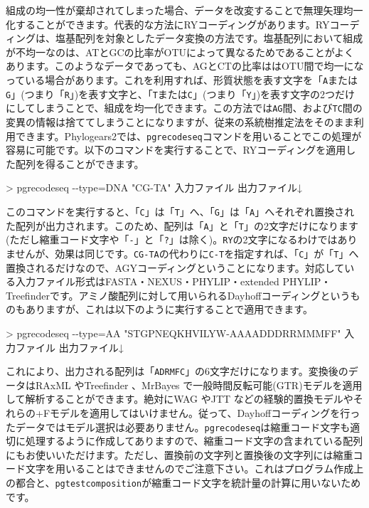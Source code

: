 \documentclass[titlepage,10pt,a4paper]{jsbook}
\newenvironment{cmd}{\begin{oframed}\raggedright\ttfamily\footnotesize\setlength{\baselineskip}{1.4em}}{\end{oframed}\vspace{-1em}}
\begin{document}
組成の均一性が棄却されてしまった場合、データを改変することで無理矢理均一化することができます。代表的な方法にRYコーディング\citep{Woese1991}があります。RYコーディングは、塩基配列を対象としたデータ変換の方法です。塩基配列において組成が不均一なのは、ATとGCの比率がOTUによって異なるためであることがよくあります。このようなデータであっても、AGとCTの比率ははOTU間で均一になっている場合があります。これを利用すれば、形質状態を表す文字を「\texttt{A}または\texttt{G}」(つまり「\texttt{R}」)を表す文字と、「\texttt{T}または\texttt{C}」(つまり「\texttt{Y}」)を表す文字の2つだけにしてしまうことで、組成を均一化できます。この方法では\texttt{AG}間、および\texttt{TC}間の変異の情報は捨ててしまうことになりますが、従来の系統樹推定法をそのまま利用できます。Phylogears2では、\texttt{pgrecodeseq}コマンドを用いることでこの処理が容易に可能です。以下のコマンドを実行することで、RYコーディングを適用した配列を得ることができます。
\begin{cmd}
{\textgreater} pgrecodeseq {-}{-}type=DNA "CG-TA" 入力ファイル 出力ファイル↓
\end{cmd}
このコマンドを実行すると、「\texttt{C}」は「\texttt{T}」へ、「\texttt{G}」は「\texttt{A}」へそれぞれ置換された配列が出力されます。このため、配列は「\texttt{A}」と「\texttt{T}」の2文字だけになります(ただし縮重コード文字や「\texttt{-}」と「\texttt{?}」は除く)。\texttt{RY}の2文字になるわけではありませんが、効果は同じです。\texttt{CG-TA}の代わりに\texttt{C-T}を指定すれば、「\texttt{C}」が「\texttt{T}」へ置換されるだけなので、AGYコーディングということになります。対応している入力ファイル形式はFASTA・NEXUS・PHYLIP・extended PHYLIP・Treefinderです。アミノ酸配列に対して用いられるDayhoffコーディング\citep{Hrdy2004}というものもありますが、これは以下のように実行することで適用できます。
\begin{cmd}
{\textgreater} pgrecodeseq {-}{-}type=AA "STGPNEQKHVILYW-AAAADDDRRMMMFF" 入力ファイル 出力ファイル↓
\end{cmd}
これにより、出力される配列は「\texttt{ADRMFC}」の6文字だけになります。変換後のデータはRAxML \citep{Stamatakis2006}やTreefinder \citep{Jobb2004}、MrBayes \citep{Ronquist2003}で一般時間反転可能(GTR)モデルを適用して解析することができます。絶対にWAG \citep{Whelan2001}やJTT \citep{Jones1992}などの経験的置換モデルやそれらの+Fモデルを適用してはいけません。従って、Dayhoffコーディングを行ったデータではモデル選択は必要ありません。\texttt{pgrecodeseq}は縮重コード文字も適切に処理するように作成してありますので、縮重コード文字の含まれている配列にもお使いいただけます。ただし、置換前の文字列と置換後の文字列には縮重コード文字を用いることはできませんのでご注意下さい。これはプログラム作成上の都合と、\texttt{pgtestcomposition}が縮重コード文字を統計量の計算に用いないためです。
\end{document}

